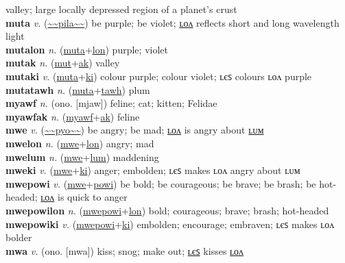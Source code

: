 valley; large locally depressed region of a planet's crust \label{mut} \\
\textbf{muta} \textit{v.} (\hyperref[pila]{\~{}\~{}pila\~{}\~{}})
be purple; be violet; \hyperref[mutalon]{ʟᴏᴧ} reflects short and long wavelength light \label{muta} \\
\textbf{mutalon} \textit{n.} (\hyperref[muta]{muta}+\hyperref[lon]{lon})
purple; violet \label{mutalon} \\
\textbf{mutak} \textit{n.} (\hyperref[mut]{mut}+\hyperref[ak]{ak})
valley \label{mutak} \\
\textbf{mutaki} \textit{v.} (\hyperref[muta]{muta}+\hyperref[ki]{ki})
colour purple; colour violet; ʟєꜱ colours ʟᴏᴧ purple \label{mutaki} \\
\textbf{mutatawh} \textit{n.} (\hyperref[muta]{muta}+\hyperref[tawh]{tawh})
plum \label{mutatawh} \\
\textbf{myawf} \textit{n.} (ono. [mjaw])
feline; cat; kitten; Felidae \label{myawf} \\
\textbf{myawfak} \textit{n.} (\hyperref[myawf]{myawf}+\hyperref[ak]{ak})
feline \label{myawfak} \\
\textbf{mwe} \textit{v.} (\hyperref[pyo]{\~{}\~{}pyo\~{}\~{}})
be angry; be mad; \hyperref[mwelon]{ʟᴏᴧ} is angry about \hyperref[mwelum]{ʟᴜᴍ} \label{mwe} \\
\textbf{mwelon} \textit{n.} (\hyperref[mwe]{mwe}+\hyperref[lon]{lon})
angry; mad \label{mwelon} \\
\textbf{mwelum} \textit{n.} (\hyperref[mwe]{mwe}+\hyperref[lum]{lum})
maddening \label{mwelum} \\
\textbf{mweki} \textit{v.} (\hyperref[mwe]{mwe}+\hyperref[ki]{ki})
anger; embolden; ʟєꜱ makes ʟᴏᴧ angry about ʟᴜᴍ \label{mweki} \\
\textbf{mwepowi} \textit{v.} (\hyperref[mwe]{mwe}+\hyperref[powi]{powi})
be bold; be courageous; be brave; be brash; be hot-headed; \hyperref[mwepowilon]{ʟᴏᴧ} is quick to anger \label{mwepowi} \\
\textbf{mwepowilon} \textit{n.} (\hyperref[mwepowi]{mwepowi}+\hyperref[lon]{lon})
bold; courageous; brave; brash; hot-headed \label{mwepowilon} \\
\textbf{mwepowiki} \textit{v.} (\hyperref[mwepowi]{mwepowi}+\hyperref[ki]{ki})
embolden; encourage; embraven; ʟєꜱ makes ʟᴏᴧ bolder \label{mwepowiki} \\
\textbf{mwa} \textit{v.} (ono. [mwa])
kiss; snog; make out; \hyperref[mwales]{ʟєꜱ} kisses \hyperref[mwalon]{ʟᴏᴧ} \label{mwa} \\
